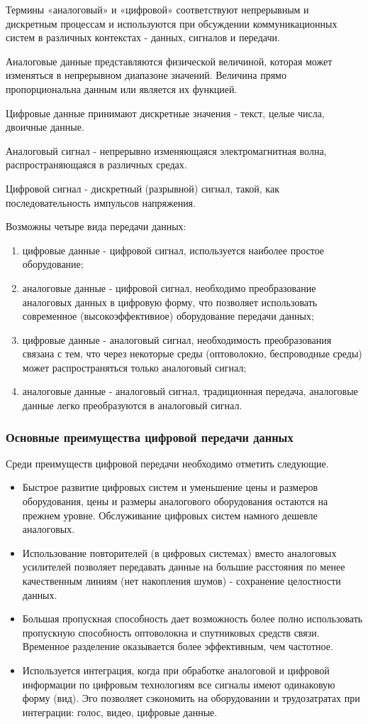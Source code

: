 \documentclass[a4paper]{report}
\begin{document}
Термины «аналоговый» и «цифровой» соответствуют непрерывным и дискретным процессам и используются при обсуждении коммуникационных систем в различных контекстах - данных, сигналов и передачи.

Аналоговые данные представляются физической величиной, которая может изменяться в непрерывном диапазоне значений. Величина прямо пропорциональна данным или является их функцией.

Цифровые данные принимают дискретные значения - текст, целые числа, двоичные данные.

Аналоговый сигнал - непрерывно изменяющаяся электромагнитная волна, распространяющаяся в различных средах.

Цифровой сигнал - дискретный (разрывной) сигнал, такой, как последовательность импульсов напряжения.

Возможны четыре вида передачи данных:
\begin{enumerate}
\item цифровые данные - цифровой сигнал, используется наиболее простое оборудование;
\item аналоговые данные - цифровой сигнал, необходимо преобразование аналоговых данных в цифровую форму, что позволяет использовать современное (высокоэффективное) оборудование передачи данных;
\item цифровые данные - аналоговый сигнал, необходимость преобразования связана с тем, что через некоторые среды (оптоволокно, беспроводные среды) может распространяться только аналоговый сигнал;
\item аналоговые данные - аналоговый сигнал, традиционная передача, аналоговые данные легко преобразуются в аналоговый сигнал.
\end{enumerate}
\subsubsection{Основные преимущества цифровой передачи данных}
Среди преимуществ цифровой передачи необходимо отметить следующие.
\begin{itemize}
\item \qquad Быстрое развитие цифровых систем и уменьшение цены и размеров оборудования, цены и размеры аналогового оборудования остаются на прежнем уровне. Обслуживание цифровых систем намного дешевле аналоговых.
\item \qquad Использование повторителей (в цифровых системах) вместо аналоговых усилителей позволяет передавать данные на большие расстояния по менее качественным линиям (нет накопления шумов) - сохранение целостности данных.
\item \qquad Большая пропускная способность дает возможность более полно использовать пропускную способность оптоволокна и спутниковых средств связи. Временное разделение оказывается более эффективным, чем частотное.
\item \qquad Используется интеграция, когда при обработке аналоговой и цифровой информации по цифровым технологиям все сигналы имеют одинаковую форму (вид). Эго позволяет сэкономить на оборудовании и трудозатратах при интеграции: голос, видео, цифровые данные.
\end{itemize}
\end{document}
